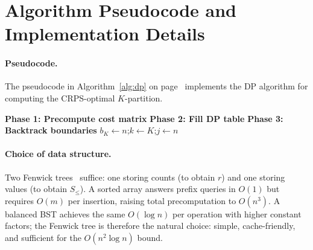 \documentclass[11pt]{article}
\begin{document}
\section{Algorithm Pseudocode and Implementation Details}
\label{app:impl}
\paragraph {Pseudocode.}
The pseudocode in Algorithm~\ref{alg:dp} on page~\pageref{alg:dp} implements the DP algorithm for computing 
the CRPS-optimal $K$-partition.

\begin{algorithm2e}[htp]
\caption{CRPS-optimal $K$-partition via dynamic programming}
\label{alg:dp}
\BlankLine
\textbf{Phase 1: Precompute cost matrix}\;
\BlankLine
\textbf{Phase 2: Fill DP table}\;
\BlankLine
\textbf{Phase 3: Backtrack boundaries}\;
$b_K \gets n$;\quad $k \gets K$;\quad $j \gets n$\;
\;
\end{algorithm2e}

\paragraph{Choice of data structure.}
Two Fenwick trees~\citep{Fenwick1994} suffice: one storing counts (to obtain $r$)
and one storing values (to obtain $S_{\le}$).
A sorted array answers prefix queries in $O(1)$ but requires $O(m)$ per insertion,
raising total precomputation to $O(n^3)$.
A balanced BST achieves the same $O(\log n)$ per operation with higher constant
factors; the Fenwick tree is therefore the natural choice: simple, cache-friendly,
and sufficient for the $O(n^2\log n)$ bound.
\end{document}
